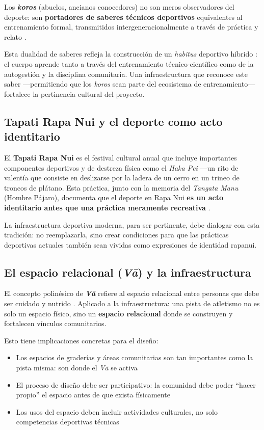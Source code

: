 \documentclass[12pt, a4paper]{article}
\begin{document}
Los \textbf{\textit{koros}} (abuelos, ancianos conocedores) no son meros observadores
del deporte: son \textbf{portadores de saberes técnicos deportivos} equivalentes al
entrenamiento formal, transmitidos intergeneracionalmente a través de práctica y
relato \citep{ortega2026}.

Esta dualidad de saberes refleja la construcción de un \textit{habitus} deportivo
híbrido \citep{bourdieu1990}: el cuerpo aprende tanto a través del entrenamiento
técnico-científico como de la autogestión y la disciplina comunitaria. Una
infraestructura que reconoce este saber ---permitiendo que los \textit{koros} sean
parte del ecosistema de entrenamiento--- fortalece la pertinencia cultural del
proyecto.

\subsection{Tapati Rapa Nui y el deporte como acto identitario}

El \textbf{Tapati Rapa Nui} es el festival cultural anual que incluye importantes
componentes deportivos y de destreza física como el \textit{Haka Pei} ---un rito de
valentía que consiste en deslizarse por la ladera de un cerro en un trineo de
troncos de plátano. Esta práctica, junto con la memoria del \textit{Tangata Manu}
(Hombre Pájaro), documenta que el deporte en Rapa Nui \textbf{es un acto identitario
antes que una práctica meramente recreativa} \citep{ortega2026, cristino2011}.

La infraestructura deportiva moderna, para ser pertinente, debe dialogar con esta
tradición: no reemplazarla, sino crear condiciones para que las prácticas deportivas
actuales también sean vividas como expresiones de identidad rapanui.

\subsection{El espacio relacional (\textit{Vā}) y la infraestructura}

El concepto polinésico de \textbf{\textit{Vā}} refiere al espacio relacional entre
personas que debe ser cuidado y nutrido \citep{kaili2005}. Aplicado a la
infraestructura: una pista de atletismo no es solo un espacio físico, sino un
\textbf{espacio relacional} donde se construyen y fortalecen vínculos comunitarios.

Esto tiene implicaciones concretas para el diseño:

\begin{itemize}[leftmargin=*, itemsep=3pt]
  \item Los espacios de graderías y áreas comunitarias son tan importantes como
        la pista misma: son donde el \textit{Vā} se activa
  \item El proceso de diseño debe ser participativo: la comunidad debe poder
        ``hacer propio'' el espacio antes de que exista físicamente
  \item Los usos del espacio deben incluir actividades culturales, no solo
        competencias deportivas técnicas
\end{itemize}
\end{document}
